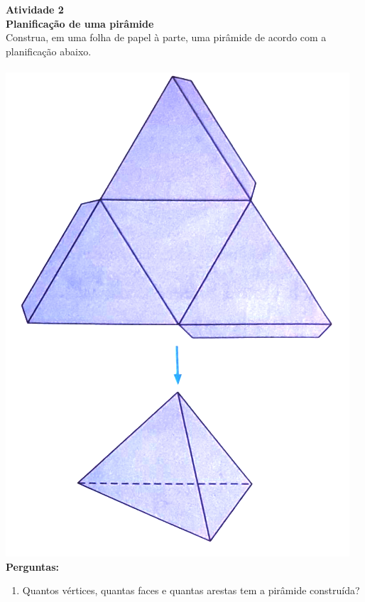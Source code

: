 \documentclass[a4paper,14pt]{article}
\begin{document}
\begin{multicols}{2}
\begin{enumerate}
    	\end{enumerate}
        \noindent \textbf{Atividade 2}\\
        \textbf{Planificação de uma pirâmide}\\
        Construa, em uma folha de papel à parte, uma pirâmide de acordo com a planificação abaixo. \\\\
        \includegraphics[width=1\linewidth]{imagens_6FMA50/imagem2}
        \textbf{Perguntas:}
        \begin{enumerate}
        	\item Quantos vértices, quantas faces e quantas arestas tem a pirâmide construída? \\\\\\\\\\\\

\end{enumerate}
\end{multicols}
\end{document}
